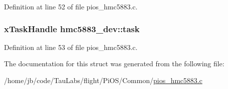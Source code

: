 \-Definition at line 52 of file pios\-\_\-hmc5883.\-c.

\hypertarget{structhmc5883__dev_a1e212c4df92f634246a79adcba32a4cf}{
\subsubsection[{task}]{\setlength{\rightskip}{0pt plus 5cm}x\-Task\-Handle {\bf hmc5883\-\_\-dev\-::task}}}\label{structhmc5883__dev_a1e212c4df92f634246a79adcba32a4cf}


\-Definition at line 53 of file pios\-\_\-hmc5883.\-c.



\-The documentation for this struct was generated from the following file\-:\begin{DoxyCompactItemize}
\item 
/home/jb/code/\-Tau\-Labs/flight/\-Pi\-O\-S/\-Common/\hyperlink{pios__hmc5883_8c}{pios\-\_\-hmc5883.\-c}\end{DoxyCompactItemize}
